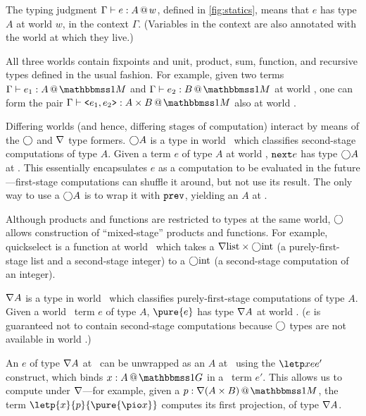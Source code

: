 \begin{abstrsyn}

The typing judgment $\Gamma{} \vdash {e}:{A}~\hspace{-0.15em}\text{@}\hspace{-0.2em}~w$, defined in \ref{fig:statics}, means that
$e$ has type $A$ at world $w$, in the context $\Gamma$. (Variables in the
context are also annotated with the world at which they live.)

All three worlds contain fixpoints and unit, product, sum, function, and
recursive types defined in the usual fashion. For example, given two terms
$\typesone{e_1}A$ and $\typesone{e_2}B$ at world \bbonem, one can form the pair
$\typesone{\texttt{<}e_1,e_2\texttt{>}}{A\times B}$ also at world \bbonem. 

Differing worlds (and hence, differing stages of computation) interact by means
of the $\bigcirc$ and $\nabla$ type formers. $\bigcirc A$ is a type in world \bbonem\
which classifies second-stage computations of type $A$. Given a term $e$ of type
$A$ at world \bbtwo, ${\tt next}{e}$ has type $\bigcirc A$ at \bbonem. This essentially
encapsulates $e$ as a computation to be evaluated in the future---first-stage
computations can shuffle it around, but not use its result.  The only way to use
a $\bigcirc A$ is to wrap it with ${\tt prev}$, yielding an $A$ at \bbtwo.


Although products and functions are restricted to types at the same world,
$\bigcirc$ allows construction of ``mixed-stage'' products and functions.
For example, quickselect is a function at world \bbonem\ which takes a
$\nabla{\rm list} \times \bigcirc{\rm int}$ (a purely-first-stage list and a
second-stage integer) to a $\bigcirc{\rm int}$ (a second-stage
computation of an integer).

$\nabla A$ is a type in world \bbonem\ which classifies purely-first-stage
computations of type $A$. Given a world \bbonep\ term $e$ of type $A$,
$\pure{e}$ has type $\nabla A$ at world \bbonem. ($e$ is guaranteed not to contain
second-stage computations because $\bigcirc$ types are not available in world
\bbonep.)

An $e$ of type $\nabla A$ at \bbonem\ can be unwrapped as an $A$ at \bbonep\
using the $\letp xe{e'}$ construct, which binds $\colpure xA$ in a \bbonem\ term
$e'$. This allows us to compute under $\nabla$---for example, given a $\colmix
p{\curr(A\times B)}$, the term $\letp{x}{p}{\pure{\pio x}}$ computes its first
projection, of type $\nabla A$.


\end{abstrsyn}
